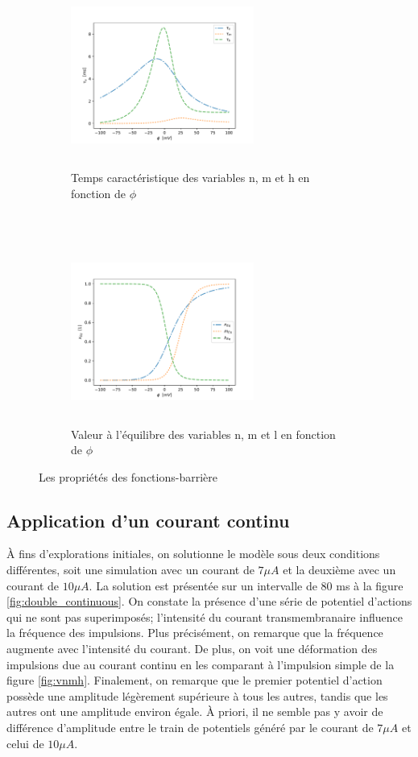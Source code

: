 \documentclass{article}
\begin{document}
\begin{figure}[H]
	\begin{subfigure}{0.5\linewidth}
		\includegraphics[width=6cm, height=6cm]{Tau.pdf}
		\centering
		\caption{Temps caractéristique des variables n, m et h en fonction de $\phi$ }
		\label{fig:tau}
	\end{subfigure}
	~
	\begin{subfigure}{0.5\linewidth}
		\includegraphics[width=6cm, height=6cm]{VarEquil.pdf}
		\centering
		\caption{Valeur à l'équilibre des variables n, m et l en fonction de $\phi$ }
		\label{fig:equil}
	\end{subfigure}
	\caption{Les propriétés des fonctions-barrière}
\end{figure}



\subsection{Application d'un courant continu}\label{sec:courant_continu}

À fins d'explorations initiales, on solutionne le modèle sous deux conditions différentes, soit une simulation avec un courant de $7 \mu A$ et la deuxième avec un courant de $10 \mu A$. La solution est présentée sur un intervalle de 80 ms à la figure \ref{fig:double_continuous}. On constate la présence d'une série de potentiel d'actions qui ne sont pas superimposés; l'intensité du courant transmembranaire influence la fréquence des impulsions. Plus précisément, on remarque que la fréquence augmente avec l'intensité du courant. De plus, on voit une déformation des impulsions due au courant continu en les comparant à l'impulsion simple de la figure \ref{fig:vnmh}. Finalement, on remarque que le premier potentiel d'action possède une amplitude légèrement supérieure à tous les autres, tandis que les autres ont une amplitude environ égale. À priori, il ne semble pas y avoir de différence d'amplitude entre le train de potentiels généré par le courant de $7 \mu A$ et celui de $10 \mu A$. 
\end{document}
